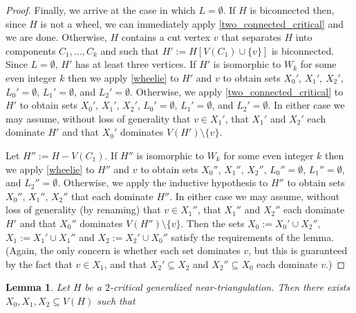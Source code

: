 \documentclass[12pt]{article}
\newtheorem{lem}{Lemma}
\theoremstyle{definition}
\begin{document}
\begin{proof}
  Finally, we arrive at the case in which $L=\emptyset$. If $H$ is biconnected then, since $H$ is not a wheel, we can immediately apply \cref{two_connected_critical} and we are done.  Otherwise, $H$ contains a cut vertex $v$ that separates $H$ into components $C_1,\ldots,C_k$ and such that $H':=H[V(C_1)\cup\{v\}]$ is biconnected. Since $L=\emptyset$, $H'$ has at least three vertices. If $H'$ is isomorphic to $W_k$ for some even integer $k$ then we apply \cref{wheelie} to $H'$ and $v$ to obtain sets $X_0'$, $X_1'$, $X_2'$, $L_0'=\emptyset$, $L_1'=\emptyset$, and $L_2'=\emptyset$. Otherwise, we apply \cref{two_connected_critical} to $H'$ to obtain sets $X_0'$, $X_1'$, $X_2'$, $L_0'=\emptyset$, $L_1'=\emptyset$, and $L_2'=\emptyset$.  In either case we may assume, without loss of generality that $v\in X_1'$, that $X_1'$ and $X_2'$ each dominate $H'$ and that $X_0'$ dominates $V(H')\setminus\{v\}$.

  Let $H'':=H-V(C_1)$. If $H''$ is isomorphic to $W_k$ for some even integer $k$ then we apply \cref{wheelie} to $H''$ and $v$ to obtain sets $X_0''$, $X_1''$, $X_2''$, $L_0''=\emptyset$, $L_1''=\emptyset$, and $L_2''=\emptyset$. Otherwise, we apply the inductive hypothesis to $H''$ to obtain sets $X_0''$, $X_1''$, $X_2''$ that each dominate $H''$. In either case we may assume, without loss of generality (by renaming) that $v\in X_1''$, that $X_1''$ and $X_2''$ each dominate $H'$ and that $X_0''$ dominates $V(H'')\setminus\{v\}$.  Then the sets $X_0:=X_0'\cup X_2''$, $X_1:=X_1'\cup X_1''$ and $X_2:=X_2'\cup X_0''$ satisfy the requirements of the lemma.  (Again, the only concern is whether each set dominates $v$, but this is guaranteed by the fact that $v\in X_1$, and that $X_2'\subseteq X_2$ and $X_2''\subseteq X_0$ each dominate $v$.)
\end{proof}


\begin{lem}\label{three_sets_coverage}
  Let $H$ be a $2$-critical generalized near-triangulation.  Then there exists $X_0,X_1,X_2\subseteq V(H)$ such that
\end{lem}
\end{document}
